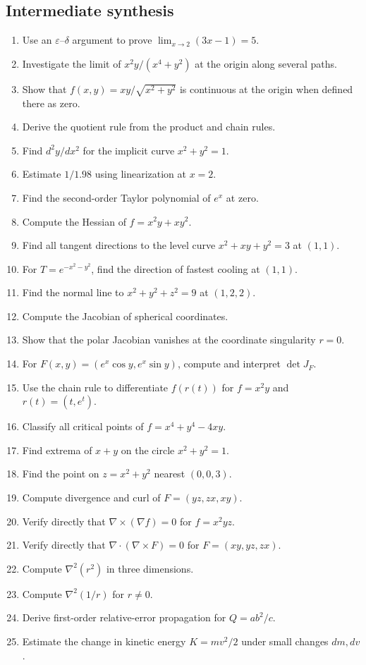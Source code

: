\subsection{Intermediate synthesis}
\begin{enumerate}
  \item Use an $\varepsilon$--$\delta$ argument to prove $\lim_{x\to2}(3x-1)=5$.
  \item Investigate the limit of $x^2y/(x^4+y^2)$ at the origin along several paths.
  \item Show that $f(x,y)=xy/\sqrt{x^2+y^2}$ is continuous at the origin when defined there as zero.
  \item Derive the quotient rule from the product and chain rules.
  \item Find $d^2y/dx^2$ for the implicit curve $x^2+y^2=1$.
  \item Estimate $1/1.98$ using linearization at $x=2$.
  \item Find the second-order Taylor polynomial of $e^x$ at zero.
  \item Compute the Hessian of $f=x^2y+xy^2$.
  \item Find all tangent directions to the level curve $x^2+xy+y^2=3$ at $(1,1)$.
  \item For $T=e^{-x^2-y^2}$, find the direction of fastest cooling at $(1,1)$.
  \item Find the normal line to $x^2+y^2+z^2=9$ at $(1,2,2)$.
  \item Compute the Jacobian of spherical coordinates.
  \item Show that the polar Jacobian vanishes at the coordinate singularity $r=0$.
  \item For $F(x,y)=(e^x\cos y,e^x\sin y)$, compute and interpret $\det J_F$.
  \item Use the chain rule to differentiate $f(r(t))$ for $f=x^2y$ and $r(t)=(t,e^t)$.
  \item Classify all critical points of $f=x^4+y^4-4xy$.
  \item Find extrema of $x+y$ on the circle $x^2+y^2=1$.
  \item Find the point on $z=x^2+y^2$ nearest $(0,0,3)$.
  \item Compute divergence and curl of $F=(yz,zx,xy)$.
  \item Verify directly that $\nabla\times(\nabla f)=0$ for $f=x^2yz$.
  \item Verify directly that $\nabla\cdot(\nabla\times F)=0$ for $F=(xy,yz,zx)$.
  \item Compute $\nabla^2(r^2)$ in three dimensions.
  \item Compute $\nabla^2(1/r)$ for $r\ne0$.
  \item Derive first-order relative-error propagation for $Q=ab^2/c$.
  \item Estimate the change in kinetic energy $K=mv^2/2$ under small changes $dm,dv$.
\end{enumerate}
